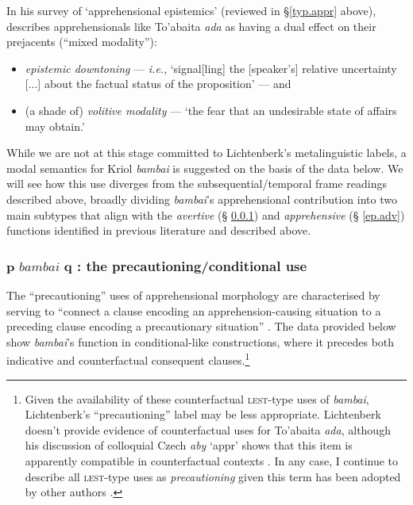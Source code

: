 In his survey of `apprehensional epistemics' (reviewed in \S \ref{typ.appr} above), \citeauthor{Lichtenberk1995} describes apprehensionals like To'abaita \textit{ada} as having a dual effect on their prejacents (``mixed modality''):
\begin{itemize}\item  \textit{epistemic downtoning} --- \textit{i.e.}, `signal[ling] the [speaker's] relative uncertainty [...] about the factual status of the proposition' --- and \item  (a shade of) \textit{volitive modality} --- `the fear that an undesirable state of affairs may obtain.' \end{itemize} While we are not at this stage committed to Lichtenberk's metalinguistic labels, a modal semantics for Kriol \textit{bambai} is suggested on the basis of the data below. We will see how this use diverges from the subsequential/temporal frame readings described above, broadly dividing \textit{bambai}'s apprehensional contribution into two main subtypes that align with the \textit{avertive} (§ \ref{lest}) and \textit{apprehensive} (§ \ref{ep.adv}) functions identified in previous literature \citep{Lichtenberk1995,Vuillermet2018} and described above.




\subsubsection[Precautioning uses]{$ \boldsymbol{p \textit{ bambai } q}$ : the precautioning/conditional use}\label{lest}

The ``precautioning'' uses of apprehensional morphology are characterised by serving to ``connect a clause encoding an apprehension-causing situation to a preceding clause encoding a precautionary situation'' \citep[298]{Lichtenberk1995}. The data provided below show \textit{bambai}'s function in conditional-like constructions, where it precedes both indicative and counterfactual consequent clauses.\footnote{Given the availability of these counterfactual \textsc{lest}-type uses of \textit{bambai}, Lichtenberk's ``precautioning'' label may be less appropriate. Lichtenberk doesn't provide evidence of counterfactual uses for To'abaita \textit{ada}, although his discussion of colloquial Czech \textit{aby} `\gls{appr}' shows that this item is apparently compatible in counterfactual contexts \citeyearpar[309]{Lichtenberk1995}. In any case, I continue to describe all \textsc{lest}-type uses as \textit{precautioning} given this term has been adopted by other authors \citep{Vuillermet2018,AnderBois2020}.}\label{lests}

